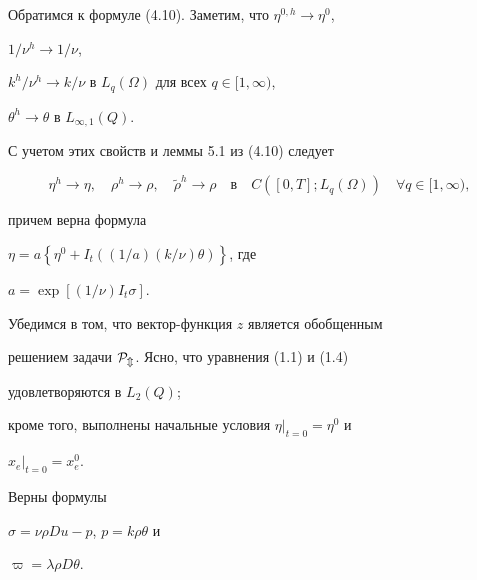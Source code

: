 \documentclass[12pt]{article}
\theoremstyle{plain} %
\newtheorem{lemm}{\hskip\parindent Лемма}[section]
\theoremstyle{definition}
\numberwithin{equation}{section}
\begin{document}
Обратимся к формуле (4.10). Заметим, что $\eta^{0,h}\to\eta^0$,


$1/\nu^h\to 1/\nu$,


$k^h/\nu^h\to k/\nu$ в $L_q(\Omega)$ для всех $q\in [1,\infty)$,


$\theta^h\to\theta$ в $L_{\infty,1}(Q)$.


С учетом этих свойств и леммы 5.1 из (4.10) следует


\begin{equation}


\eta^h\to\eta,\quad \rho^h\to\rho,\quad


\widetilde\rho^h\to\rho\quad\text{в}\quad


C([0,T];L_q(\Omega))\quad \forall q\in [1,\infty),


\end{equation}


причем верна формула


$\eta = a\left\{\eta^{0} +


I_t\left((1/a)(k/\nu)\theta\right)\right\}$, где


$a=\exp\left[(1/\nu)I_t\sigma\right]$.





Убедимся в том, что вектор-функция $z$ является обобщенным


решением задачи $\cal P_m$. Ясно, что уравнения (1.1) и (1.4)


удовлетворяются в $L_2(Q)$;


кроме того, выполнены начальные условия $\eta|_{t=0}=\eta^0$ и


$x_e|_{t=0}=x^0_e$.





\begin{lemm} Верны формулы


$\sigma=\nu \rho Du-p$, $p=k\rho\theta$ и


$\varpi=\lambda \rho D\theta$.


\end{lemm}
\end{document}
